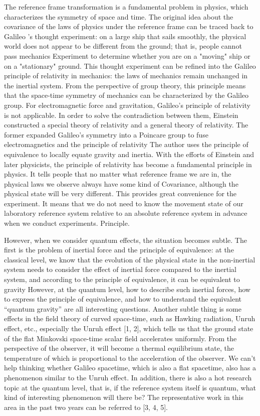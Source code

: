 \documentclass{article}
\begin{document}
        The reference frame transformation is a fundamental problem in physics, which characterizes the symmetry of space and time. The original idea about the covariance of the laws of physics under the reference frame can be traced back to Galileo ’s thought experiment: on a large ship that sails smoothly, the physical world does not appear to be different from the ground; that is, people cannot pass mechanics Experiment to determine whether you are on a "moving" ship or on a "stationary" ground. This thought experiment can be refined into the Galileo principle of relativity in mechanics: the laws of mechanics remain unchanged in the inertial system. From the perspective of group theory, this principle means that the space-time symmetry of mechanics can be characterized by the Galileo group. For electromagnetic force and gravitation, Galileo's principle of relativity is not applicable. In order to solve the contradiction between them, Einstein constructed a special theory of relativity and a general theory of relativity. The former expanded Galileo's symmetry into a Poincare group to fuse electromagnetics and the principle of relativity The author uses the principle of equivalence to locally equate gravity and inertia. With the efforts of Einstein and later physicists, the principle of relativity has become a fundamental principle in physics. It tells people that no matter what reference frame we are in, the physical laws we observe always have some kind of Covariance, although the physical state will be very different. This provides great convenience for the experiment. It means that we do not need to know the movement state of our laboratory reference system relative to an absolute reference system in advance when we conduct experiments. Principle.

        However, when we consider quantum effects, the situation becomes subtle. The first is the problem of inertial force and the principle of equivalence: at the classical level, we know that the evolution of the physical state in the non-inertial system needs to consider the effect of inertial force compared to the inertial system, and according to the principle of equivalence, it can be equivalent to gravity However, at the quantum level, how to describe such inertial forces, how to express the principle of equivalence, and how to understand the equivalent “quantum gravity” are all interesting questions. Another subtle thing is some effects in the field theory of curved space-time, such as Hawking radiation, Unruh effect, etc., especially the Unruh effect [1, 2], which tells us that the ground state of the flat Minkovski space-time scalar field accelerates uniformly. From the perspective of the observer, it will become a thermal equilibrium state, the temperature of which is proportional to the acceleration of the observer. We can't help thinking whether Galileo spacetime, which is also a flat spacetime, also has a phenomenon similar to the Unruh effect. In addition, there is also a hot research topic at the quantum level, that is, if the reference system itself is quantum, what kind of interesting phenomenon will there be? The representative work in this area in the past two years can be referred to [3, 4, 5].
\end{document}
